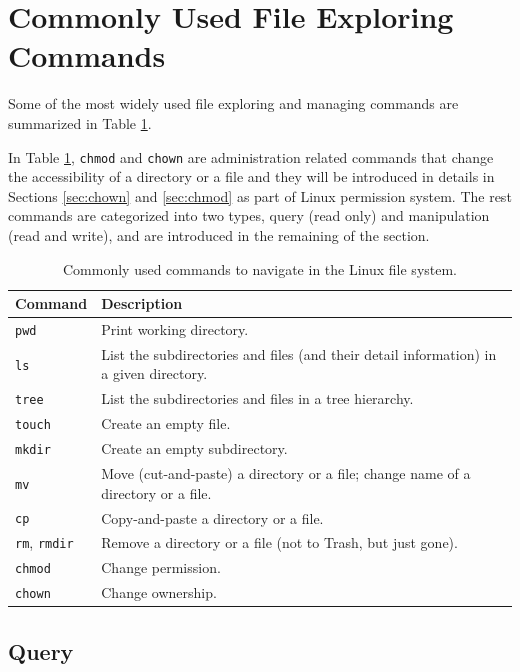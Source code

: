 \section{Commonly Used File Exploring Commands} \label{ch:fm:sec:filemanagement}

Some of the most widely used file exploring and managing commands are summarized in Table \ref{ch:fm:tab:commonfilecommands}. 

In Table \ref{ch:fm:tab:commonfilecommands}, \verb|chmod| and \verb|chown| are administration related commands that change the accessibility of a directory or a file and they will be introduced in details in Sections \ref{sec:chown} and \ref{sec:chmod} as part of Linux permission system. The rest commands are categorized into two types, query (read only) and manipulation (read and write), and are introduced in the remaining of the section.

\begin{table}[!htb]
  \centering \caption{Commonly used commands to navigate in the Linux file system.}\label{ch:fm:tab:commonfilecommands}
  \begin{tabularx}{\textwidth}{lX}
    \hline
    Command & Description \\ \hline
    \verb|pwd| & Print working directory. \\ 
    \verb|ls| & List the subdirectories and files (and their detail information) in a given directory. \\ 
    \verb|tree| & List the subdirectories and files in a tree hierarchy. \\  
    \verb|touch| & Create an empty file. \\ 
    \verb|mkdir| & Create an empty subdirectory. \\ 
    \verb|mv| & Move (cut-and-paste) a directory or a file; change name of a directory or a file. \\ 
    \verb|cp| & Copy-and-paste a directory or a file. \\ 
    \verb|rm|, \verb|rmdir| & Remove a directory or a file (not to Trash, but just gone). \\ 
    \verb|chmod| & Change permission. \\ 
    \verb|chown| & Change ownership. \\
    \hline
  \end{tabularx}
\end{table}

\subsection{Query}

